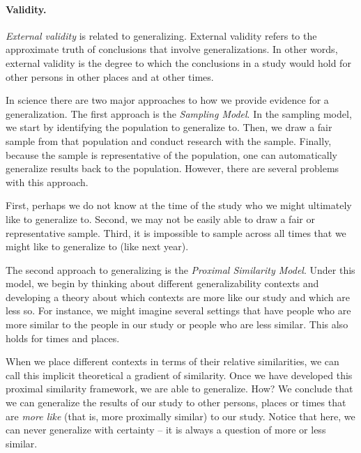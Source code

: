 \paragraph{Validity.}
\emph{External validity} is related to generalizing.
\marginpar{\begin{small}\begin{flushleft}\textcolor{blue}{Validity refers to the approximate truth of propositions, inferences, or conclusions}\end{flushleft}\end{small}}
External validity refers to the approximate truth of conclusions that involve generalizations. In other words, external validity is the degree to which the conclusions in a study would hold for other persons in other places and at other times.

In science there are two major approaches to how we provide evidence for a generalization. The first approach is the \emph{Sampling Model}.
In the sampling model, we start by identifying the population to generalize to. Then, we draw a fair sample from that population and conduct research with the sample. Finally, because the sample is representative of the population, one can automatically generalize results back to the population. However, there are several problems with this approach.

First, perhaps we do not know at the time of the study who we might ultimately like to generalize to. Second, we may not be easily able to draw a fair or representative sample. Third, it is impossible to sample across all times that we might like to generalize to (like next year).

The second approach to generalizing is the \emph{Proximal Similarity Model}.
Under this model, we begin by thinking about different generalizability contexts and developing a theory about which contexts are more like our study and which are less so. For instance, we might imagine several settings that have people who are more similar to the people in our study or people who are less similar. This also holds for times and places.

When we place different contexts in terms of their relative similarities, we can call this implicit theoretical a gradient of similarity. Once we have developed this proximal similarity framework, we are able to generalize. How? We conclude that we can generalize the results of our study to other persons, places or times that are \emph{more like} (that is, more proximally similar) to our study. Notice that here, we can never generalize with certainty -- it is always a question of more or less similar.

